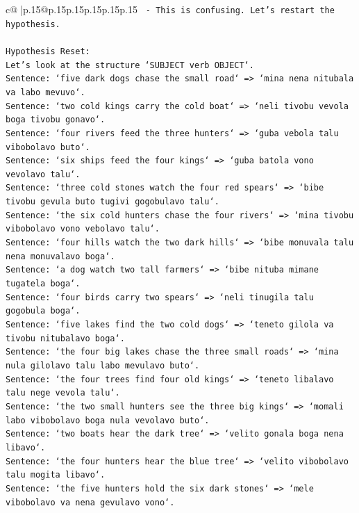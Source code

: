 \documentclass{article}
\begin{document}
{\begin{supertabular}{c@{$\;$}|p{.15\linewidth}@{}p{.15\linewidth}p{.15\linewidth}p{.15\linewidth}p{.15\linewidth}p{.15\linewidth}}
{{{\texttt{                     {-} This is confusing. Let's restart the hypothesis.} \\
\\ 
\texttt{Hypothesis Reset:} \\
\texttt{Let's look at the structure `SUBJECT verb OBJECT`.} \\
\texttt{Sentence: `five dark dogs chase the small road` => `mina nena nitubala va labo mevuvo`.} \\
\texttt{Sentence: `two cold kings carry the cold boat` => `neli tivobu vevola boga tivobu gonavo`.} \\
\texttt{Sentence: `four rivers feed the three hunters` => `guba vebola talu vibobolavo buto`.} \\
\texttt{Sentence: `six ships feed the four kings` => `guba batola vono vevolavo talu`.} \\
\texttt{Sentence: `three cold stones watch the four red spears` => `bibe tivobu gevula buto tugivi gogobulavo talu`.} \\
\texttt{Sentence: `the six cold hunters chase the four rivers` => `mina tivobu vibobolavo vono vebolavo talu`.} \\
\texttt{Sentence: `four hills watch the two dark hills` => `bibe monuvala talu nena monuvalavo boga`.} \\
\texttt{Sentence: `a dog watch two tall farmers` => `bibe nituba mimane tugatela boga`.} \\
\texttt{Sentence: `four birds carry two spears` => `neli tinugila talu gogobula boga`.} \\
\texttt{Sentence: `five lakes find the two cold dogs` => `teneto gilola va tivobu nitubalavo boga`.} \\
\texttt{Sentence: `the four big lakes chase the three small roads` => `mina nula gilolavo talu labo mevulavo buto`.} \\
\texttt{Sentence: `the four trees find four old kings` => `teneto libalavo talu nege vevola talu`.} \\
\texttt{Sentence: `the two small hunters see the three big kings` => `momali labo vibobolavo boga nula vevolavo buto`.} \\
\texttt{Sentence: `two boats hear the dark tree` => `velito gonala boga nena libavo`.} \\
\texttt{Sentence: `the four hunters hear the blue tree` => `velito vibobolavo talu mogita libavo`.} \\
\texttt{Sentence: `the five hunters hold the six dark stones` => `mele vibobolavo va nena gevulavo vono`.} \\
}}}
\end{supertabular}}
\end{document}
